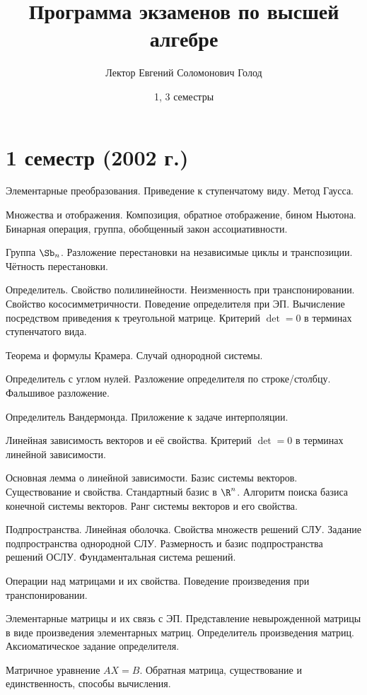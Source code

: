 \documentclass[a4paper]{article}
\title{Программа экзаменов по высшей алгебре}
\author{Лектор Евгений Соломонович Голод}
\date{1, 3 семестры}
\begin{document}
\maketitle

\section*{1 семестр (2002 г.)}

\begin{nums}{0}
\item Элементарные преобразования. Приведение к ступенчатому виду. Метод Гаусса.
\item Множества и отображения. Композиция, обратное отображение, бином Ньютона. Бинарная операция, группа,
обобщенный закон ассоциативности.
\item Группа $\Sb_n$. Разложение перестановки на независимые циклы и транспозиции. Чётность перестановки.
\item Определитель. Свойство полилинейности. Неизменность при транспонировании. Свойство кососимметричности.
Поведение определителя при ЭП.
Вычисление посредством приведения к треугольной матрице. Критерий $\det=0$ в терминах ступенчатого вида.
\item Теорема и формулы Крамера. Случай однородной системы.
\item Определитель с углом нулей. Разложение определителя по строке/столбцу. Фальшивое разложение.
\item Определитель Вандермонда. Приложение к задаче интерполяции.
\item Линейная зависимость векторов и её свойства. Критерий $\det=0$ в терминах линейной зависимости.
\item Основная лемма о линейной зависимости. Базис системы векторов. Существование и свойства. Стандартный
базис в $\R^n$. Алгоритм поиска базиса
конечной системы векторов. Ранг системы векторов и его свойства.
\item Подпространства. Линейная оболочка. Свойства множеств решений СЛУ. Задание подпространства однородной
СЛУ. Размерность и базис
подпространства решений ОСЛУ. Фундаментальная система решений.
\item Операции над матрицами и их свойства. Поведение произведения при транспонировании.
\item Элементарные матрицы и их связь с ЭП. Представление невырожденной матрицы в виде произведения элементарных
матриц. Определитель произведения матриц. Аксиоматическое задание определителя.
\item Матричное уравнение $AX=B$. Обратная матрица, существование и единственность, способы вычисления.

\end{nums}
\end{document}
